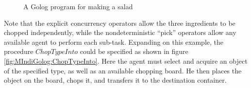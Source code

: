 %
\begin{figure}
\begin{centering}
\par\end{centering}

\caption{A Golog program for making a salad\label{fig:MIndiGolog:MakeSalad}}

\end{figure}


Note that the explicit concurrency operators allow the three ingredients
to be chopped independently, while the nondeterministic {}``pick''
operators allow any available agent to perform each sub-task. Expanding
on this example, the procedure $ChopTypeInto$ could be specified
as shown in figure \ref{fig:MIndiGolog:ChopTypeInto}. Here the agent
must select and acquire an object of the specified type, as well as
an available chopping board. He then places the object on the board,
chops it, and transfers it to the destination container.

